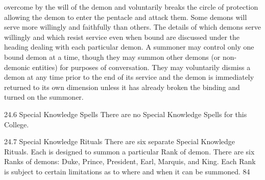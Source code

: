 \documentclass[a4paper]{article}
\begin{document}
\begin{multicols}{3}
overcome by the will of the demon and voluntarily
breaks the circle of protection allowing the demon
to enter the pentacle and attack them.
Some demons will serve more willingly and faithfully than others. The details of which demons
serve willingly and which resist service even when
bound are discussed under the heading dealing
with each particular demon. A summoner may
control only one bound demon at a time, though
they may summon other demons (or non-demonic
entities) for purposes of conversation. They may
voluntarily dismiss a demon at any time prior to
the end of its service and the demon is immediately
returned to its own dimension unless it has already
broken the binding and turned on the summoner.

24.6 Special Knowledge Spells
There are no Special Knowledge Spells for this
College.

24.7 Special Knowledge Rituals
There are six separate Special Knowledge Rituals.
Each is designed to summon a particular Rank of
demon. There are six Ranks of demons: Duke,
Prince, President, Earl, Marquis, and King. Each
Rank is subject to certain limitations as to where
and when it can be summoned.
84


\end{multicols}
\end{document}
